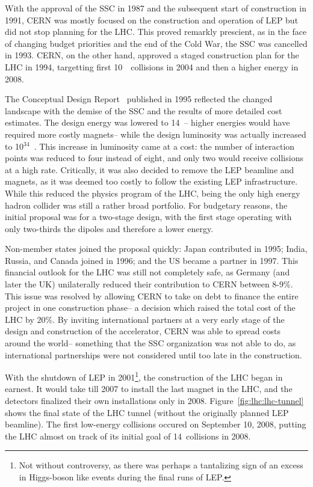 
With the approval of the SSC in 1987 and the subsequent start of construction in 1991, CERN was mostly focused on the construction and operation of LEP but did not stop planning for the LHC. This proved remarkly prescient, as in the face of changing budget priorities and the end of the Cold War, the SSC was cancelled in 1993.  CERN, on the other hand, approved a staged construction plan for the LHC in 1994, targetting first 10~\TeV~collisions in 2004 and then a higher energy in 2008.

The Conceptual Design Report~\cite{LHCCDR} published in 1995 reflected the changed landscape with the demise of the SSC and the results of more detailed cost estimates. The design energy was lowered to 14~\TeV-- higher energies would have required more costly magnets-- while the design luminosity was actually increased to 10$^{34}$~\lumirate. This increase in luminosity came at a cost: the number of interaction points was reduced to four instead of eight, and only two would receive collisions at a high rate. Critically, it was also decided to remove the LEP beamline and magnets, as it was deemed too costly to follow the existing LEP infrastructure. While this reduced the physics program of the LHC, being the only high energy hadron collider was still a rather broad portfolio. For budgetary reasons, the initial proposal was for a two-stage design, with the first stage operating with only two-thirds the dipoles and therefore a lower energy.

Non-member states joined the proposal quickly: Japan contributed in 1995; India, Russia, and Canada joined in 1996; and the US became a partner in 1997. This financial outlook for the LHC was still not completely safe, as Germany (and later the UK) unilaterally reduced their contribution to CERN between 8-9$\%$. This issue was resolved by allowing CERN to take on debt to finance the entire project in one construction phase-- a decision which raised the total cost of the LHC by $20\%$. By inviting international partners at a very early stage of the design and construction of the accelerator, CERN was able to spread costs around the world-- something that the SSC organization was not able to do, as international partnerships were not considered until too late in the construction.


With the shutdown of LEP in 2001\footnote{Not without controversy, as there was perhaps a tantalizing sign of an excess in Higgs-boson like events during the final runs of LEP.}, the construction of the LHC began in earnest. It would take till 2007 to install the last magnet in the LHC, and the detectors finalized their own installations only in 2008. Figure~\ref{fig:lhc:lhc-tunnel} shows the final state of the LHC tunnel (without the originally planned LEP beamline). The first low-energy collisions occured on September 10, 2008, putting the LHC almost on track of its initial goal of 14~\TeV collisions in 2008. 

